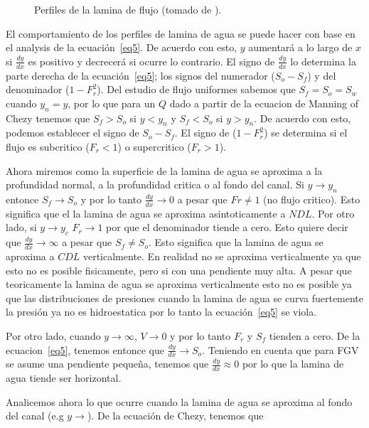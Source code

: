 \documentclass[11pt, oneside]{article}
\begin{document}
\begin{figure}[h]
\centering
\caption{Perfiles de la lamina de flujo (tomado de \cite{Chau}).}
\label{fig3}
\end{figure}
 
El comportamiento de los  perfiles de lamina de agua se puede hacer con base en el analysis de la ecuaci\'on~\ref{eq5}. De acuerdo con esto, $y$ aumentar\'a a lo largo de $x$ si $\frac{dy}{dx}$ es positivo y decrecer\'a si ocurre lo contrario. El signo de $\frac{dy}{dx}$ lo determina la parte derecha de la ecuaci\'on~\ref{eq5}; los signos del numerador ($S_o - S_f $) y del denominador ($1-F_r^2$). Del estudio de flujo uniformes sabemos que $S_f = S_o = S_w$ cuando $y_n = y$, por lo que para un $Q$ dado a partir de la ecuacion de Manning of Chezy tenemos que $S_f > S_o$ si $y< y_n$ y $S_f < S_o$ si $y > y_n$. De acuerdo con esto, podemos establecer el signo de $S_o - S_f$. El signo de ($1-F_r^2$) se determina si el flujo es subcritico ($F_r < 1$) o supercritico ($F_r > 1$). 

Ahora miremos como la superficie de la lamina de agua se aproxima a la profundidad normal, a la profundidad critica o al fondo del canal. Si $y \rightarrow y_n$ entonce $S_f \rightarrow S_o$ y por lo tanto $\frac{dy}{dx} \rightarrow 0$ a pesar que $Fr \neq 1$ (no flujo critico). Esto significa que el la lamina de agua se aproxima asintoticamente a $NDL$. Por otro lado, si $y \rightarrow y_c$ $F_r \rightarrow 1$ por que el denominador tiende a cero. Esto quiere decir que $\frac{dy}{dx} \rightarrow \infty$ a pesar que $S_f \neq S_o$. Esto significa que la lamina de agua se aproxima a $CDL$ verticalmente. En realidad no se aproxima verticalmente ya que esto no es posible fisicamente, pero si con una pendiente muy alta. A pesar que teoricamente la lamina de agua se aproxima verticalmente esto no es posible ya que las distribuciones de presiones cuando la  lamina de agua se curva fuertemente la presi\'on ya no es hidroestatica por lo tanto la ecuaci\'on~\ref{eq5} se viola.  

Por otro lado, cuando $y \rightarrow \infty$, $V \rightarrow 0$ y por lo tanto $F_r$ y $S_f$ tienden a cero. De la ecuacion~\ref{eq5}, tenemos entonce que $\frac{dy}{dx} \rightarrow S_o$. Teniendo en cuenta que para FGV se asume una pendiente pequeña, tenemos que $\frac{dy}{dx} \approx 0$ por lo que la lamina de agua tiende ser horizontal. 

Analicemos ahora lo que ocurre cuando la lamina de agua se aproxima al fondo del canal (e.g $y \rightarrow$). De la ecuaci\'on de Chezy, tenemos que
\end{document}
